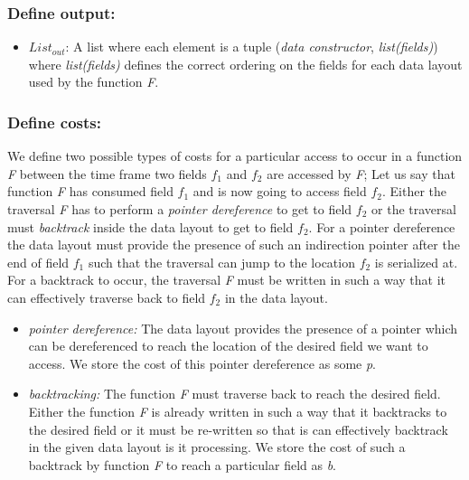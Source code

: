 \subsubsection{Define output: }

\begin{itemize}

  \item $List_{out}$: A list where each element is a tuple (\textit{data constructor}, \textit{list(fields)})
                      where \textit{list(fields)} defines the correct ordering on the fields for each data layout
                      used by the function \textit{F}.

\end{itemize}

\subsubsection{Define costs: }

We define two possible types of costs for a particular access to occur in a function \textit{F} between the time frame two fields
 $f_1$ and $f_2$ are accessed by \textit{F}; 
 Let us say that function \textit{F} has consumed field $f_1$ and is now going 
 to access field $f_2$.
 Either the traversal \textit{F} has to perform a \textit{pointer dereference} to get to field $f_2$ 
 or the traversal must \textit{backtrack} inside the data layout to get to field $f_2$.  
 For a pointer dereference the data layout must provide the presence of such an indirection pointer after the end of field $f_1$
 such that the traversal can jump to the location $f_2$ is serialized at. 
 For a backtrack to occur, the traversal \textit{F} must be written in such a way that it can effectively traverse back to field $f_2$ in the 
 data layout.  

\begin{itemize}
  \item \textit{pointer dereference:} The data layout provides the presence of a pointer which can be dereferenced to 
                                      reach the location of the desired field we want to access. We store the cost of this 
                                      pointer dereference as some \textit{p}.

  \item \textit{backtracking: } The function \textit{F} must traverse back to reach the desired field. Either the function \textit{F}
                                is already written in such a way that it backtracks to the desired field or it must be re-written so 
                                that is can effectively backtrack in the given data layout is it processing. 
                                We store the cost of such a backtrack by function \textit{F} to reach a particular field as \textit{b}. 
\end{itemize}



